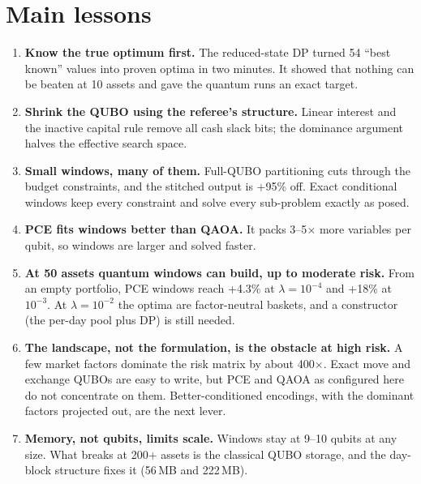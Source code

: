 \documentclass[11pt]{article}
\begin{document}
\section{Main lessons}
\begin{enumerate}
\item \textbf{Know the true optimum first.} The reduced-state DP turned 54 ``best known'' values into
  proven optima in two minutes. It showed that nothing can be beaten at 10 assets and gave the quantum
  runs an exact target.
\item \textbf{Shrink the QUBO using the referee's structure.} Linear interest and the inactive capital
  rule remove all cash slack bits; the dominance argument halves the effective search space.
\item \textbf{Small windows, many of them.} Full-QUBO partitioning cuts through the budget
  constraints, and the stitched output is +95\% off. Exact conditional windows keep every
  constraint and solve every sub-problem exactly as posed.
\item \textbf{PCE fits windows better than QAOA.} It packs 3--5$\times$ more variables per qubit,
  so windows are larger and solved faster.
\item \textbf{At 50 assets quantum windows can build, up to moderate risk.} From an empty portfolio,
  PCE windows reach +4.3\% at $\lambda=10^{-4}$ and +18\% at $10^{-3}$. At $\lambda=10^{-2}$ the
  optima are factor-neutral baskets, and a constructor (the per-day pool plus DP) is still needed.
\item \textbf{The landscape, not the formulation, is the obstacle at high risk.} A few market factors
  dominate the risk matrix by about 400$\times$. Exact move and exchange QUBOs are easy to write, but
  PCE and QAOA as configured here do not concentrate on them. Better-conditioned encodings, with the
  dominant factors projected out, are the next lever.
\item \textbf{Memory, not qubits, limits scale.} Windows stay at 9--10 qubits at any size. What breaks
  at 200+ assets is the classical QUBO storage, and the day-block structure fixes it (56\,MB and 222\,MB).
\end{enumerate}
\end{document}
